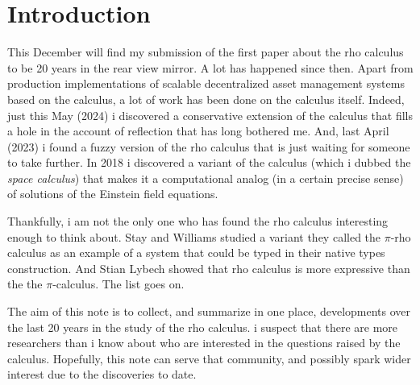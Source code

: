 \section{Introduction}\label{sec:introduction} %
This December will find my submission of the first paper about the rho
calculus to be 20 years in the rear view mirror. A lot has happened
since then. Apart from production implementations of scalable
decentralized asset management systems based on the calculus, a lot of
work has been done on the calculus itself. Indeed, just this May
(2024) i discovered a conservative extension of the calculus that
fills a hole in the account of reflection that has long bothered
me. And, last April (2023) i found a fuzzy version of the rho calculus
that is just waiting for someone to take further. In 2018 i discovered
a variant of the calculus (which i dubbed the \emph{space calculus})
that makes it a computational analog (in a certain precise sense) of
solutions of the Einstein field equations.

Thankfully, i am not the only one who has found the rho calculus
interesting enough to think about. Stay and Williams studied a variant
they called the $\pi$-rho calculus as an example of a system that
could be typed in their native types construction. And Stian Lybech
showed that rho calculus is more expressive than the the
$\pi$-calculus. The list goes on.

The aim of this note is to collect, and summarize in one place,
developments over the last 20 years in the study of the rho
calculus. i suspect that there are more researchers than i know about
who are interested in the questions raised by the calculus. Hopefully,
this note can serve that community, and possibly spark wider interest
due to the discoveries to date.

